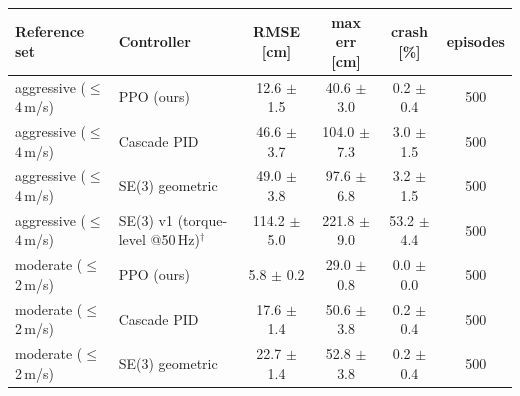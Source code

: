 \begin{tabular}{llcccc}\toprule
Reference set & Controller & RMSE [cm] & max err [cm] & crash [\%] & episodes\\\midrule
aggressive ($\le$4\,m/s) & PPO (ours) & 12.6 $\pm$ 1.5 & 40.6 $\pm$ 3.0 & 0.2 $\pm$ 0.4 & 500\\
aggressive ($\le$4\,m/s) & Cascade PID & 46.6 $\pm$ 3.7 & 104.0 $\pm$ 7.3 & 3.0 $\pm$ 1.5 & 500\\
aggressive ($\le$4\,m/s) & SE(3) geometric & 49.0 $\pm$ 3.8 & 97.6 $\pm$ 6.8 & 3.2 $\pm$ 1.5 & 500\\
aggressive ($\le$4\,m/s) & SE(3) v1 (torque-level @50\,Hz)$^\dagger$ & 114.2 $\pm$ 5.0 & 221.8 $\pm$ 9.0 & 53.2 $\pm$ 4.4 & 500\\
\midrule
moderate ($\le$2\,m/s) & PPO (ours) & 5.8 $\pm$ 0.2 & 29.0 $\pm$ 0.8 & 0.0 $\pm$ 0.0 & 500\\
moderate ($\le$2\,m/s) & Cascade PID & 17.6 $\pm$ 1.4 & 50.6 $\pm$ 3.8 & 0.2 $\pm$ 0.4 & 500\\
moderate ($\le$2\,m/s) & SE(3) geometric & 22.7 $\pm$ 1.4 & 52.8 $\pm$ 3.8 & 0.2 $\pm$ 0.4 & 500\\
\bottomrule\end{tabular}
